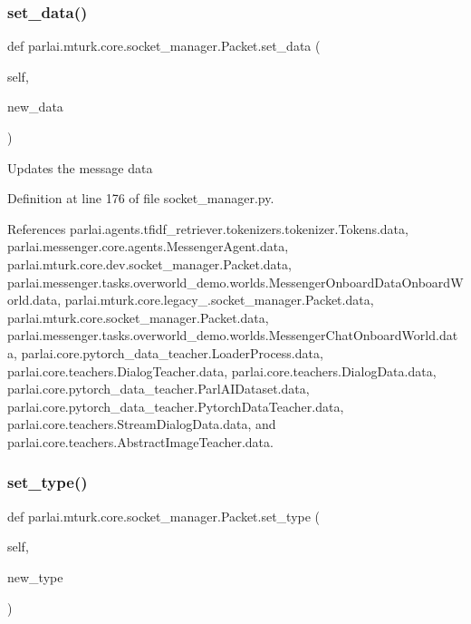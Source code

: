\subsubsection{\texorpdfstring{set\+\_\+data()}{set\_data()}}
{\footnotesize\ttfamily def parlai.\+mturk.\+core.\+socket\+\_\+manager.\+Packet.\+set\+\_\+data (\begin{DoxyParamCaption}\item[{}]{self,  }\item[{}]{new\+\_\+data }\end{DoxyParamCaption})}

\begin{DoxyVerb}Updates the message data\end{DoxyVerb}
 

Definition at line 176 of file socket\+\_\+manager.\+py.



References parlai.\+agents.\+tfidf\+\_\+retriever.\+tokenizers.\+tokenizer.\+Tokens.\+data, parlai.\+messenger.\+core.\+agents.\+Messenger\+Agent.\+data, parlai.\+mturk.\+core.\+dev.\+socket\+\_\+manager.\+Packet.\+data, parlai.\+messenger.\+tasks.\+overworld\+\_\+demo.\+worlds.\+Messenger\+Onboard\+Data\+Onboard\+World.\+data, parlai.\+mturk.\+core.\+legacy\+\_.\+socket\+\_\+manager.\+Packet.\+data, parlai.\+mturk.\+core.\+socket\+\_\+manager.\+Packet.\+data, parlai.\+messenger.\+tasks.\+overworld\+\_\+demo.\+worlds.\+Messenger\+Chat\+Onboard\+World.\+data, parlai.\+core.\+pytorch\+\_\+data\+\_\+teacher.\+Loader\+Process.\+data, parlai.\+core.\+teachers.\+Dialog\+Teacher.\+data, parlai.\+core.\+teachers.\+Dialog\+Data.\+data, parlai.\+core.\+pytorch\+\_\+data\+\_\+teacher.\+Parl\+A\+I\+Dataset.\+data, parlai.\+core.\+pytorch\+\_\+data\+\_\+teacher.\+Pytorch\+Data\+Teacher.\+data, parlai.\+core.\+teachers.\+Stream\+Dialog\+Data.\+data, and parlai.\+core.\+teachers.\+Abstract\+Image\+Teacher.\+data.

\mbox{\label{classparlai_1_1mturk_1_1core_1_1socket__manager_1_1Packet_a1269876ae5939e52c10fe4526d50cde4}} 
\subsubsection{\texorpdfstring{set\+\_\+type()}{set\_type()}}
{\footnotesize\ttfamily def parlai.\+mturk.\+core.\+socket\+\_\+manager.\+Packet.\+set\+\_\+type (\begin{DoxyParamCaption}\item[{}]{self,  }\item[{}]{new\+\_\+type }\end{DoxyParamCaption})}

